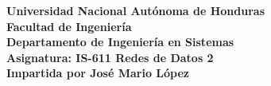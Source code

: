 \begin{center}
\bfseries{Universidad Nacional Autónoma de Honduras}\\
Facultad de Ingeniería\\
Departamento de Ingeniería en Sistemas\\
\bigskip
\bigskip
Asignatura: IS-611 Redes de Datos 2\\
Impartida  por José Mario López
\end{center}